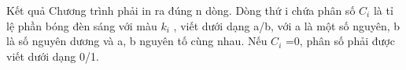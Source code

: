 Kết quả
Chương trình phải in ra đúng n dòng. Dòng thứ i chứa phân số $C_{i}$   là tỉ lệ phần bóng đèn sáng với màu $k_{i}$   , viết dưới dạng a/b, với a là một số nguyên, b là số nguyên dương và a, b nguyên tố cùng nhau. Nếu $C_{i}$   =0, phân số phải được viết dưới dạng 0/1.